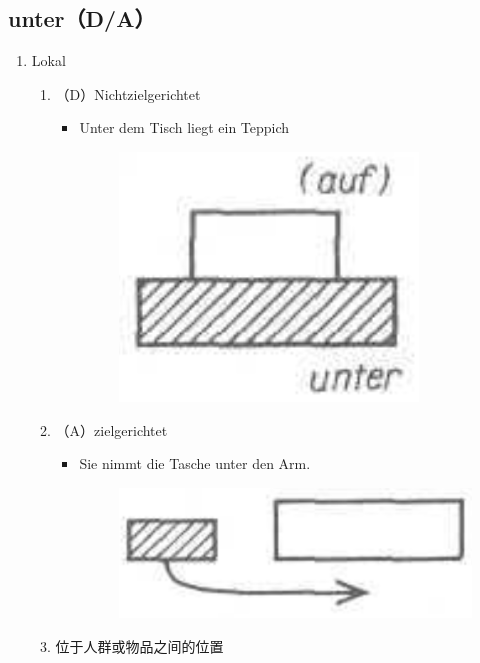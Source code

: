 \documentclass[UTF8]{report}
\begin{document}
\subsection{unter（D/A）}
\begin{enumerate}
    \item Lokal
    \begin{enumerate}
        \item （D）Nichtzielgerichtet
        \begin{itemize}
            \item Unter dem Tisch liegt ein Teppich
            \begin{figure}[H]
                \centering
                \includegraphics[scale=0.3]{unter1.png}
            \end{figure}
        \end{itemize}
        \item （A）zielgerichtet
        \begin{itemize}
            \item Sie nimmt die Tasche unter den Arm.
            \begin{figure}[H]
                \centering
                \includegraphics[scale=0.3]{unter2.png}
            \end{figure}
        \end{itemize}
        \item 位于人群或物品之间的位置
        \begin{enumerate}

\end{enumerate}
\end{enumerate}
\end{enumerate}
\end{document}
